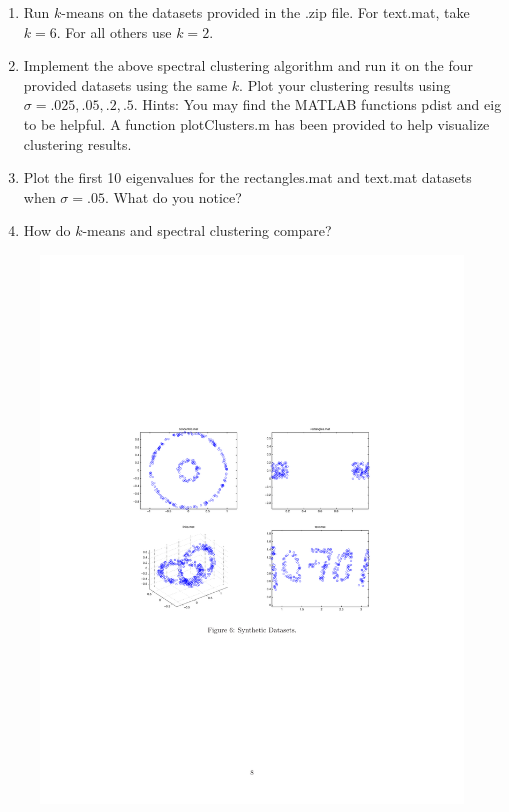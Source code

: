 \documentclass[11pt]{article}
\begin{document}
\begin{enumerate}
	\item Run $k$-means on the datasets provided in the .zip file. For text.mat, take $k = 6$. For all others use $k = 2$.
	\item  Implement the above spectral clustering algorithm and run it on the four provided datasets using the same $k$. Plot your clustering results using $\sigma = .025, .05, .2, .5$. Hints: You may find the MATLAB functions pdist and eig to be helpful. A function plotClusters.m has been provided to help visualize clustering results.
	\item Plot the first 10 eigenvalues for the rectangles.mat and text.mat datasets when $\sigma = .05$. What do you notice?
	\item How do $k$-means and spectral clustering compare?
\end{enumerate}
\begin{figure}[h!]
	\centering
	\includegraphics[width=\linewidth]{syn}
\end{figure}
\end{document}
